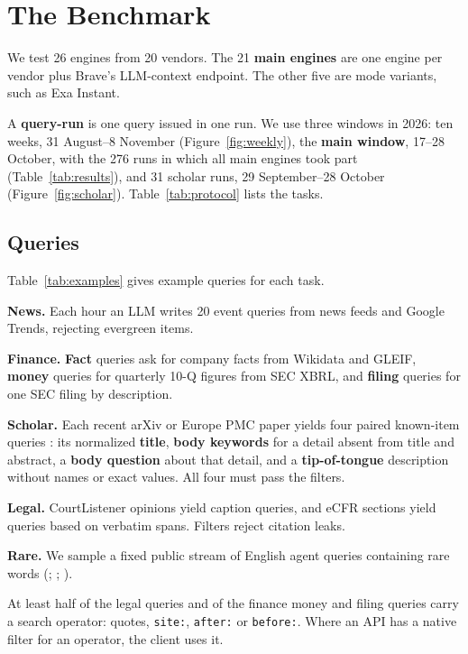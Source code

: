 \documentclass[11pt]{article}
\begin{document}
\section{The Benchmark}
\label{sec:bench}

We test 26 engines from 20 vendors. The 21 \textbf{main engines} are
one engine per vendor plus Brave's LLM-context endpoint. The other five
are mode variants, such as Exa Instant.

A \textbf{query-run} is one query issued in one run. We use three
windows in 2026: ten weeks, 31 August--8 November
(Figure~\ref{fig:weekly}), the \textbf{main window}, 17--28 October,
with the 276 runs in which all main engines took part
(Table~\ref{tab:results}), and 31 scholar runs, 29 September--28 October
(Figure~\ref{fig:scholar}). Table~\ref{tab:protocol} lists the tasks.

\subsection{Queries}

Table~\ref{tab:examples} gives example queries for each task.

\textbf{News.} Each hour an LLM writes 20 event queries from news feeds
and Google Trends, rejecting evergreen items.

\textbf{Finance.} \textbf{Fact} queries ask for company facts from
Wikidata \citep{vrandecic2014wikidata} and GLEIF, \textbf{money} queries
for quarterly 10-Q figures from SEC XBRL, and \textbf{filing} queries
for one SEC filing by description.

\textbf{Scholar.} Each recent arXiv or Europe PMC \citep{europepmc2015}
paper yields four paired known-item queries
\citep{azzopardi2007simulated,exa2026publications}:
its normalized \textbf{title}, \textbf{body keywords} for a detail absent
from title and abstract, a \textbf{body question} about that detail, and
a \textbf{tip-of-tongue} description \citep{arguello2021tot} without
names or exact values. All four must pass the filters.

\textbf{Legal.} CourtListener opinions yield caption queries, and eCFR
sections yield queries based on verbatim spans. Filters reject citation
leaks.

\textbf{Rare.} We sample a fixed public stream of English agent queries
containing rare words (\mbox{\citealp{ning2026agentic}}; \mbox{\citealp{li2026openresearcher}}; \mbox{\citealp{zhou2026lrat}}).

At least half of the legal queries and of the finance money and filing
queries carry a search operator: quotes, \texttt{site:}, \texttt{after:}
or \texttt{before:}. Where an API has a native filter for an operator,
the client uses it.
\end{document}
